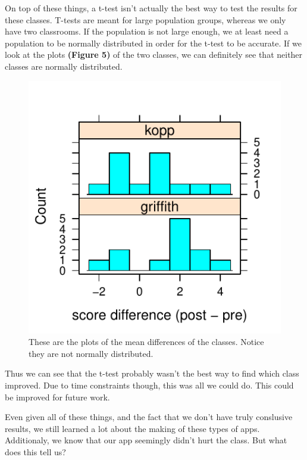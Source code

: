 \documentclass[titlepage]{article}\usepackage[]{graphicx}\usepackage[]{color}
\makeatletter
\def\maxwidth{ %
  \ifdim\Gin@nat@width>\linewidth
    \linewidth
  \else
    \Gin@nat@width
  \fi
}
\newenvironment{knitrout}{}{} %
\makeatother
\begin{document}
On top of these things, a t-test isn't actually the best way to test the results for these classes. T-tests are meant for large population groups, whereas we only have two classrooms. If the population is not large enough, we at least need a population to be normally distributed in order for the t-test to be accurate. If we look at the plots \textbf{(Figure 5)} of the two classes, we can definitely see that neither classes are normally distributed. 

\begin{figure}
\begin{knitrout}
\color{fgcolor}

{\centering \includegraphics[width=\maxwidth]{figure/unnamed-chunk-9-1} 

}



\end{knitrout}
\caption{These are the plots of the mean differences of the classes. Notice they are not normally distributed.}
\end{figure}

\noindent Thus we can see that the t-test probably wasn't the best way to find which class improved. Due to time constraints though, this was all we could do. This could be improved for future work.

Even given all of these things, and the fact that we don't have truly conslusive results, we still learned a lot about the making of these types of apps. Additionaly, we know that our app seemingly didn't hurt the class. But what does this tell us?
\end{document}
